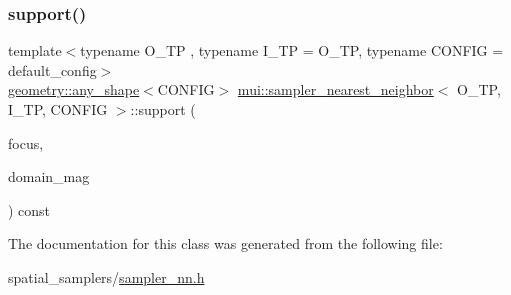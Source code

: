 \mbox{\label{classmui_1_1sampler__nearest__neighbor_a6644a7e88f3f66b8ca6fd772cd0d4090}} 
\subsubsection{\texorpdfstring{support()}{support()}}
{\footnotesize\ttfamily template$<$typename O\+\_\+\+TP , typename I\+\_\+\+TP  = O\+\_\+\+TP, typename C\+O\+N\+F\+IG  = default\+\_\+config$>$ \\
\hyperlink{classmui_1_1geometry_1_1any__shape}{geometry\+::any\+\_\+shape}$<$C\+O\+N\+F\+IG$>$ \hyperlink{classmui_1_1sampler__nearest__neighbor}{mui\+::sampler\+\_\+nearest\+\_\+neighbor}$<$ O\+\_\+\+TP, I\+\_\+\+TP, C\+O\+N\+F\+IG $>$\+::support (\begin{DoxyParamCaption}\item[{\hyperlink{classmui_1_1sampler__nearest__neighbor_ace9bf5dd74eb5ff63c05941c5cf2a825}{point\+\_\+type}}]{focus,  }\item[{\hyperlink{classmui_1_1sampler__nearest__neighbor_ab3c299b171cbfaba19246f02644c062a}{R\+E\+AL}}]{domain\+\_\+mag }\end{DoxyParamCaption}) const\hspace{0.3cm}{\ttfamily [inline]}}



The documentation for this class was generated from the following file\+:\begin{DoxyCompactItemize}
\item 
spatial\+\_\+samplers/\hyperlink{sampler__nn_8h}{sampler\+\_\+nn.\+h}\end{DoxyCompactItemize}
